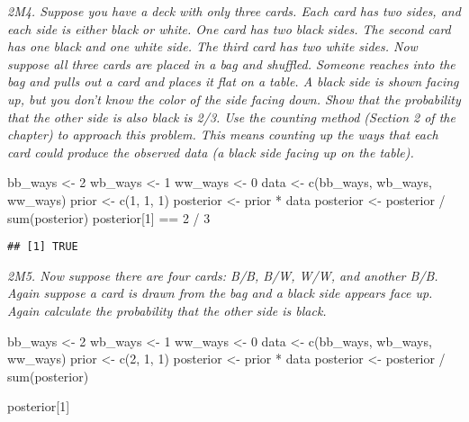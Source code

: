 \documentclass[
]{book}
\newenvironment{Shaded}{\begin{snugshade}}{\end{snugshade}}
\newcommand{\DecValTok}[1]{\textcolor[rgb]{0.00,0.00,0.81}{#1}}
\newcommand{\FunctionTok}[1]{\textcolor[rgb]{0.00,0.00,0.00}{#1}}
\newcommand{\NormalTok}[1]{#1}
\newcommand{\OtherTok}[1]{\textcolor[rgb]{0.56,0.35,0.01}{#1}}
\newcommand{\SpecialCharTok}[1]{\textcolor[rgb]{0.00,0.00,0.00}{#1}}
\begin{document}
\emph{2M4. Suppose you have a deck with only three cards. Each card has two sides, and each side is either black or white. One card has two black sides. The second card has one black and one white side. The third card has two white sides. Now suppose all three cards are placed in a bag and shuffled. Someone reaches into the bag and pulls out a card and places it flat on a table. A black side is shown facing up, but you don't know the color of the side facing down. Show that the probability that the other side is also black is 2/3. Use the counting method (Section 2 of the chapter) to approach this problem. This means counting up the ways that each card could produce the observed data (a black side facing up on the table).}

\begin{Shaded}
\begin{Highlighting}[]
\NormalTok{bb\_ways }\OtherTok{\textless{}{-}} \DecValTok{2}
\NormalTok{wb\_ways }\OtherTok{\textless{}{-}} \DecValTok{1}
\NormalTok{ww\_ways }\OtherTok{\textless{}{-}} \DecValTok{0}
\NormalTok{data }\OtherTok{\textless{}{-}} \FunctionTok{c}\NormalTok{(bb\_ways, wb\_ways, ww\_ways)}
\NormalTok{prior }\OtherTok{\textless{}{-}} \FunctionTok{c}\NormalTok{(}\DecValTok{1}\NormalTok{, }\DecValTok{1}\NormalTok{, }\DecValTok{1}\NormalTok{)}
\NormalTok{posterior }\OtherTok{\textless{}{-}}\NormalTok{ prior }\SpecialCharTok{*}\NormalTok{ data}
\NormalTok{posterior }\OtherTok{\textless{}{-}}\NormalTok{ posterior }\SpecialCharTok{/} \FunctionTok{sum}\NormalTok{(posterior)}
\NormalTok{posterior[}\DecValTok{1}\NormalTok{] }\SpecialCharTok{==} \DecValTok{2} \SpecialCharTok{/} \DecValTok{3}
\end{Highlighting}
\end{Shaded}

\begin{verbatim}
## [1] TRUE
\end{verbatim}

\emph{2M5. Now suppose there are four cards: B/B, B/W, W/W, and another B/B. Again suppose a card is drawn from the bag and a black side appears face up. Again calculate the probability that the other side is black.}

\begin{Shaded}
\begin{Highlighting}[]
\NormalTok{bb\_ways }\OtherTok{\textless{}{-}} \DecValTok{2}
\NormalTok{wb\_ways }\OtherTok{\textless{}{-}} \DecValTok{1}
\NormalTok{ww\_ways }\OtherTok{\textless{}{-}} \DecValTok{0}
\NormalTok{data }\OtherTok{\textless{}{-}} \FunctionTok{c}\NormalTok{(bb\_ways, wb\_ways, ww\_ways)}
\NormalTok{prior }\OtherTok{\textless{}{-}} \FunctionTok{c}\NormalTok{(}\DecValTok{2}\NormalTok{, }\DecValTok{1}\NormalTok{, }\DecValTok{1}\NormalTok{)}
\NormalTok{posterior }\OtherTok{\textless{}{-}}\NormalTok{ prior }\SpecialCharTok{*}\NormalTok{ data}
\NormalTok{posterior }\OtherTok{\textless{}{-}}\NormalTok{ posterior }\SpecialCharTok{/} \FunctionTok{sum}\NormalTok{(posterior)}

\NormalTok{posterior[}\DecValTok{1}\NormalTok{]}
\end{Highlighting}
\end{Shaded}
\end{document}
